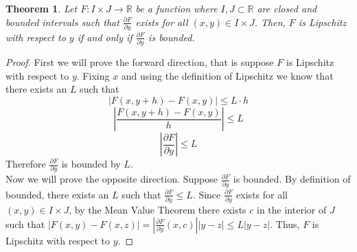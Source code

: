 \documentclass[12pt,oneside]{amsart}
\newtheorem{theorem}[equation]{Theorem}
\theoremstyle{definition}
\theoremstyle{remark}
\numberwithin{equation}{exer}
\begin{document}
\begin{theorem}
Let $F:I\times J\rightarrow\mathbb{R}$ be a function where $I,J\subset\mathbb{R}$ are closed and bounded intervals such that $\frac{\partial F}{\partial y}$ exists for all $(x,y)\in I\times J$. Then, $F$ is Lipschitz with respect to $y$ if and only if $\frac{\partial F}{\partial y}$ is bounded.
\end{theorem}
\begin{proof}
First we will prove the forward direction, that is suppose $F$ is Lipschitz with respect to $y$. Fixing $x$ and using the definition of Lipschitz we know that there exists an $L$ such that
$$|F(x,y+h)-F(x,y)|\leq L\cdot h$$
$$|\frac{F(x,y+h)-F(x,y)}{h}|\leq L$$
$$|\frac{\partial F}{\partial y}|\leq L$$
Therefore $\frac{\partial F}{\partial y}$ is bounded by $L$. \\
Now we will prove the opposite direction. Suppose $\frac{\partial F}{\partial y}$ is bounded. By definition of bounded, there exists an $L$ such that $\frac{\partial F}{\partial y}\leq L$. Since $\frac{\partial F}{\partial y}$ exists for all $(x,y)\in I\times J$, by the Mean Value Theorem there exists $c$ in the interior of $J$ such that $|F(x,y)-F(x,z)|=|\frac{\partial F}{\partial y}(x,c)||y-z|\leq L|y-z|$. Thus, $F$ is Lipschitz with respect to $y$.
\end{proof}
\end{document}
